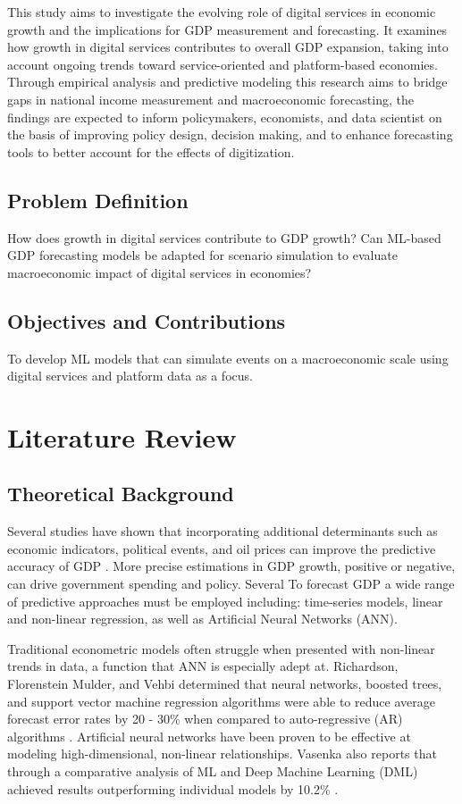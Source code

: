 \documentclass[12pt]{article}
\begin{document}
        This study aims to investigate the evolving role of digital services in economic growth and the implications for GDP measurement and forecasting. It examines how growth in digital services contributes to overall GDP expansion, taking into account ongoing trends toward service-oriented and platform-based economies. Through empirical analysis and predictive modeling this research aims to bridge gaps in national income measurement and macroeconomic forecasting, the findings are expected to inform policymakers, economists, and data scientist on the basis of improving policy design, decision making, and to enhance forecasting tools to better account for the effects of digitization.
    \subsection*{Problem Definition}
        How does growth in digital services contribute to GDP growth?
        Can ML-based GDP forecasting models be adapted for scenario simulation to evaluate macroeconomic impact of digital services in economies?
    \subsection*{Objectives and Contributions}
        To develop ML models that can simulate events on a macroeconomic scale using digital services and platform data as a focus.

\section{Literature Review}
    \subsection*{Theoretical Background}
        
        Several studies have shown that incorporating additional determinants
such as economic indicators, political events, and oil prices
can improve the predictive accuracy of GDP \cite{ADEWALE2024200132}. More precise estimations in GDP growth, positive or negative, can drive government spending and policy. Several To forecast GDP a wide range of predictive approaches must be employed including: time-series models, linear and non-linear regression, as well as Artificial Neural Networks (ANN). 
        
        Traditional econometric models often struggle when presented with non-linear trends in data, a function that ANN is especially adept at. Richardson, Florenstein Mulder, and Vehbi determined that neural networks, boosted trees, and support vector machine regression algorithms were able to reduce average forecast error rates by 20 - 30\% when compared to auto-regressive (AR) algorithms \cite{RICHARDSON2021941}. Artificial neural networks have been proven to be effective at modeling high-dimensional, non-linear relationships. Vasenka also reports that through a comparative analysis of ML and Deep Machine Learning (DML) achieved results outperforming individual models by 10.2\% \cite{Vasenska2025}.
        
\end{document}
